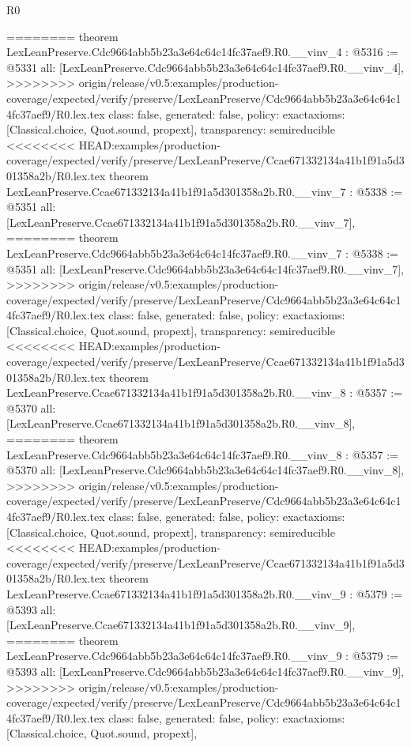 \begin{lexlean}{R0}
\begin{coremodule}
{{{{{{{{{{{{{{{{{{{{{{{{{{{{{{{{{{{{{{{{{{{{{{{{{{{{{{{{{{{{{{{{{{{{{{{{{{========
theorem LexLeanPreserve.Cdc9664abb5b23a3e64c64c14fc37aef9.R0.__vinv_4 : @5316 := @5331 {
  all: [LexLeanPreserve.Cdc9664abb5b23a3e64c64c14fc37aef9.R0.__vinv_4],
>>>>>>>> origin/release/v0.5:examples/production-coverage/expected/verify/preserve/LexLeanPreserve/Cdc9664abb5b23a3e64c64c14fc37aef9/R0.lex.tex
  class: false,
  generated: false,
  policy: exact{axioms: [Classical.choice, Quot.sound, propext]},
  transparency: semireducible
}
<<<<<<<< HEAD:examples/production-coverage/expected/verify/preserve/LexLeanPreserve/Ccae671332134a41b1f91a5d301358a2b/R0.lex.tex
theorem LexLeanPreserve.Ccae671332134a41b1f91a5d301358a2b.R0.__vinv_7 : @5338 := @5351 {
  all: [LexLeanPreserve.Ccae671332134a41b1f91a5d301358a2b.R0.__vinv_7],
========
theorem LexLeanPreserve.Cdc9664abb5b23a3e64c64c14fc37aef9.R0.__vinv_7 : @5338 := @5351 {
  all: [LexLeanPreserve.Cdc9664abb5b23a3e64c64c14fc37aef9.R0.__vinv_7],
>>>>>>>> origin/release/v0.5:examples/production-coverage/expected/verify/preserve/LexLeanPreserve/Cdc9664abb5b23a3e64c64c14fc37aef9/R0.lex.tex
  class: false,
  generated: false,
  policy: exact{axioms: [Classical.choice, Quot.sound, propext]},
  transparency: semireducible
}
<<<<<<<< HEAD:examples/production-coverage/expected/verify/preserve/LexLeanPreserve/Ccae671332134a41b1f91a5d301358a2b/R0.lex.tex
theorem LexLeanPreserve.Ccae671332134a41b1f91a5d301358a2b.R0.__vinv_8 : @5357 := @5370 {
  all: [LexLeanPreserve.Ccae671332134a41b1f91a5d301358a2b.R0.__vinv_8],
========
theorem LexLeanPreserve.Cdc9664abb5b23a3e64c64c14fc37aef9.R0.__vinv_8 : @5357 := @5370 {
  all: [LexLeanPreserve.Cdc9664abb5b23a3e64c64c14fc37aef9.R0.__vinv_8],
>>>>>>>> origin/release/v0.5:examples/production-coverage/expected/verify/preserve/LexLeanPreserve/Cdc9664abb5b23a3e64c64c14fc37aef9/R0.lex.tex
  class: false,
  generated: false,
  policy: exact{axioms: [Classical.choice, Quot.sound, propext]},
  transparency: semireducible
}
<<<<<<<< HEAD:examples/production-coverage/expected/verify/preserve/LexLeanPreserve/Ccae671332134a41b1f91a5d301358a2b/R0.lex.tex
theorem LexLeanPreserve.Ccae671332134a41b1f91a5d301358a2b.R0.__vinv_9 : @5379 := @5393 {
  all: [LexLeanPreserve.Ccae671332134a41b1f91a5d301358a2b.R0.__vinv_9],
========
theorem LexLeanPreserve.Cdc9664abb5b23a3e64c64c14fc37aef9.R0.__vinv_9 : @5379 := @5393 {
  all: [LexLeanPreserve.Cdc9664abb5b23a3e64c64c14fc37aef9.R0.__vinv_9],
>>>>>>>> origin/release/v0.5:examples/production-coverage/expected/verify/preserve/LexLeanPreserve/Cdc9664abb5b23a3e64c64c14fc37aef9/R0.lex.tex
  class: false,
  generated: false,
  policy: exact{axioms: [Classical.choice, Quot.sound, propext]},
}}}}}}}}}}}}}}}}}}}}}}}}}}}}}}}}}}}}}}}}}}}}}}}}}}}}}}}}}}}}}}}}}}}}}}}}}}}}}}
\end{coremodule}
\end{lexlean}
